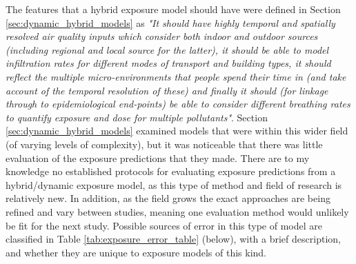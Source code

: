 The features that a hybrid exposure model should have were defined in Section \ref{sec:dynamic_hybrid_models} as \textit{"It should have highly temporal and spatially resolved air quality inputs which consider both indoor and outdoor sources (including regional and local source for the latter), it should be able to model infiltration rates for different modes of transport and building types, it should reflect the multiple micro-environments that people spend their time in (and take account of the temporal resolution of these) and finally it should (for linkage through to epidemiological end-points) be able to consider different breathing rates to quantify exposure and dose for multiple pollutants"}. Section \ref{sec:dynamic_hybrid_models} examined models that were within this wider field (of varying levels of complexity), but it was noticeable that there was little evaluation of the exposure predictions that they made. There are to my knowledge no established protocols for evaluating exposure predictions from a hybrid/dynamic exposure model, as this type of method and field of research is relatively new. In addition, as the field grows the exact approaches are being refined and vary between studies, meaning one evaluation method would unlikely be fit for the next study. Possible sources of error in this type of model are classified in Table \ref{tab:exposure_error_table} (below), with a brief description, and whether they are unique to exposure models of this kind.

